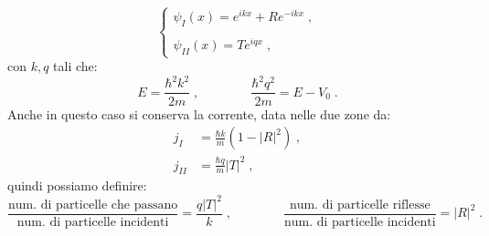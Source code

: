 \documentclass[12pt,a4paper]{report}
\theoremstyle{definition}
\numberwithin{equation}{section}
\begin{document}
\begin{equation}
\begin{cases}
\psi_I(x)=e^{ikx}+Re^{-ikx}\;, \\
\\
\psi_{II}(x)=Te^{iqx}\;,
\end{cases}
\end{equation}
con $k,q$ tali che:
\begin{equation}
E=\frac{\hbar^2 k^2}{2m}\;,\qquad\qquad \frac{\hbar^2 q^2}{2m}=E-V_0\;.
\end{equation}
Anche in questo caso si conserva la corrente, data nelle due zone da:
\begin{align*}
j_I &=\frac{\hbar k}{m}(1-|R|^2)\;, \\
j_{II} &=\frac{\hbar q}{m}|T|^2\;,
\end{align*}
quindi possiamo definire:
$$
\frac{\mbox{num. di particelle che passano}}{\mbox{num. di particelle incidenti}}=\frac{q|T|^2}{k}\;, \qquad \qquad
\frac{\mbox{num. di particelle riflesse}}{\mbox{num. di particelle incidenti}}=|R|^2\;.
$$
\end{document}
